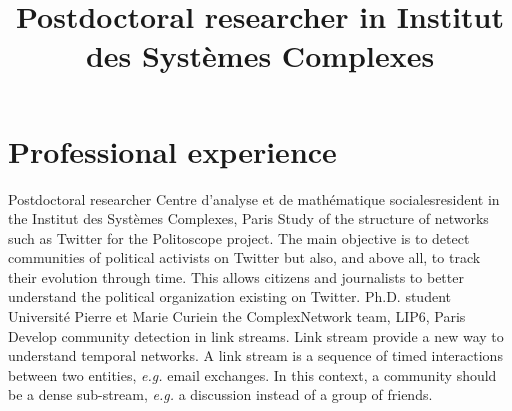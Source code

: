 \documentclass[11pt,a4paper]{moderncv}
\title{Postdoctoral researcher in Institut des Systèmes Complexes }
\begin{document}
\maketitle
\vspace{-1.2cm}

\section{Professional experience}
 {Postdoctoral researcher} {Centre d’analyse et de mathématique sociales}{}{resident in the Institut des Systèmes Complexes, Paris}
{
	Study of the structure of networks such as Twitter for the Politoscope project. The main objective is to detect communities of political activists on Twitter but also, and above all, to track their evolution through time. This allows citizens and journalists to better understand the political organization existing on Twitter.
}
\vspace*{0.2cm}
 {Ph.D. student} {Université Pierre et Marie Curie}{}{in the ComplexNetwork team, LIP6, Paris}
{
 Develop community detection in link streams. Link stream provide a new way to understand temporal networks.
A link stream is a sequence of timed interactions between two entities, \emph{e.g.} email exchanges.
In this context, a community should be a dense sub-stream, \emph{e.g.} a discussion instead of a group of
friends.
}
\vspace*{0.2cm}
%
\vspace*{0.2cm}


\end{document}
